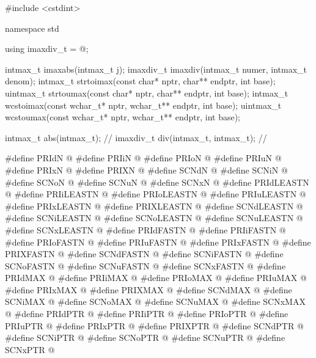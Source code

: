 %
%
%
%
%
%
%
%
\begin{codeblock}
#include <cstdint>

namespace std {
  using imaxdiv_t = @\seebelow@;

  intmax_t imaxabs(intmax_t j);
  imaxdiv_t imaxdiv(intmax_t numer, intmax_t denom);
  intmax_t strtoimax(const char* nptr, char** endptr, int base);
  uintmax_t strtoumax(const char* nptr, char** endptr, int base);
  intmax_t wcstoimax(const wchar_t* nptr, wchar_t** endptr, int base);
  uintmax_t wcstoumax(const wchar_t* nptr, wchar_t** endptr, int base);

  intmax_t abs(intmax_t);  // \seebelow
  imaxdiv_t div(intmax_t, intmax_t);  // \seebelow
}

#define PRIdN @\seebelow@
#define PRIiN @\seebelow@
#define PRIoN @\seebelow@
#define PRIuN @\seebelow@
#define PRIxN @\seebelow@
#define PRIXN @\seebelow@
#define SCNdN @\seebelow@
#define SCNiN @\seebelow@
#define SCNoN @\seebelow@
#define SCNuN @\seebelow@
#define SCNxN @\seebelow@ 
#define PRIdLEASTN @\seebelow@
#define PRIiLEASTN @\seebelow@
#define PRIoLEASTN @\seebelow@
#define PRIuLEASTN @\seebelow@
#define PRIxLEASTN @\seebelow@
#define PRIXLEASTN @\seebelow@
#define SCNdLEASTN @\seebelow@
#define SCNiLEASTN @\seebelow@
#define SCNoLEASTN @\seebelow@
#define SCNuLEASTN @\seebelow@
#define SCNxLEASTN @\seebelow@ 
#define PRIdFASTN @\seebelow@
#define PRIiFASTN @\seebelow@
#define PRIoFASTN @\seebelow@
#define PRIuFASTN @\seebelow@
#define PRIxFASTN @\seebelow@
#define PRIXFASTN @\seebelow@
#define SCNdFASTN @\seebelow@
#define SCNiFASTN @\seebelow@
#define SCNoFASTN @\seebelow@
#define SCNuFASTN @\seebelow@
#define SCNxFASTN @\seebelow@ 
#define PRIdMAX @\seebelow@
#define PRIiMAX @\seebelow@
#define PRIoMAX @\seebelow@
#define PRIuMAX @\seebelow@
#define PRIxMAX @\seebelow@
#define PRIXMAX @\seebelow@
#define SCNdMAX @\seebelow@
#define SCNiMAX @\seebelow@
#define SCNoMAX @\seebelow@
#define SCNuMAX @\seebelow@
#define SCNxMAX @\seebelow@ 
#define PRIdPTR @\seebelow@
#define PRIiPTR @\seebelow@
#define PRIoPTR @\seebelow@
#define PRIuPTR @\seebelow@
#define PRIxPTR @\seebelow@
#define PRIXPTR @\seebelow@
#define SCNdPTR @\seebelow@
#define SCNiPTR @\seebelow@
#define SCNoPTR @\seebelow@
#define SCNuPTR @\seebelow@
#define SCNxPTR @\seebelow@
\end{codeblock}

